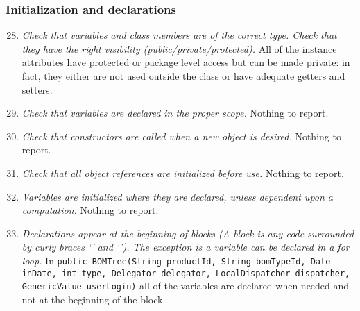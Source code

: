 	\subsubsection{Initialization and declarations}
		\begin{enumerate}
			\setcounter{enumi}{27}
			\item \textit{Check that variables and class members are of the correct type. Check that they have the right visibility (public/private/protected).}\newline
			All of the instance attributes have protected or package level access but can be made private: in fact, they either are not used outside the class or have adequate getters and setters.

			\item \textit{Check that variables are declared in the proper scope.}\newline
			Nothing to report. %

			\item \textit{Check that constructors are called when a new object is desired.}\newline
			Nothing to report. %

			\item \textit{Check that all object references are initialized before use.}\newline
			Nothing to report. %

			\item \textit{Variables are initialized where they are declared, unless dependent upon a computation.}\newline
			Nothing to report. %

			\item \textit{Declarations appear at the beginning of blocks (A block is any code surrounded by curly braces ‘{’ and ‘}’). The exception is a variable can be declared in a for loop.}\newline
			In \texttt{public BOMTree(String productId, String bomTypeId, Date inDate, int type, Delegator delegator, LocalDispatcher dispatcher, GenericValue userLogin)} all of the variables are declared when needed and not at the beginning of the block. %
		\end{enumerate}

